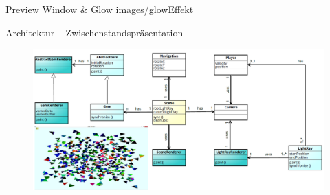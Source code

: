 {
	\begin{figure}
		\centering
	\end{figure}
}

\slidegraphic
{Preview Window \& Glow}
{images/glowEffekt}
{}

\begin{frame}{Architektur -- Zwischenstandspräsentation}
	\begin{figure}
		\centering
		\includegraphics[width=\textwidth, height=0.8\textheight, keepaspectratio]{images/klassendiagramm}
	\end{figure}
\end{frame}

